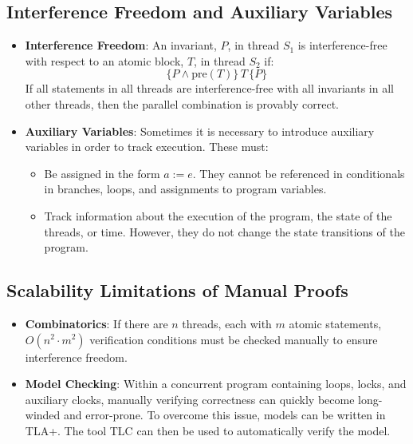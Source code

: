 \documentclass[a4paper,12pt]{report}
\begin{document}
\subsection{Interference Freedom and Auxiliary Variables}
\begin{itemize}[itemsep=0.25em, topsep=0.15em]
    \item \textbf{Interference Freedom}: An invariant, $P$, in thread $S_1$ is interference-free with respect to an atomic block, $T$, in thread $S_2$ if:
    \begin{equation}
        \{P \land \mathrm{pre}(T)\}\, T \,\{P\}
    \end{equation}
    If all statements in all threads are interference-free with all invariants in all other threads, then the parallel combination is provably correct.
    \item \textbf{Auxiliary Variables}: Sometimes it is necessary to introduce auxiliary variables in order to track execution. These must:
    \begin{itemize}[itemsep=0.15em]
        \item Be assigned in the form $a := e$. They cannot be referenced in conditionals in branches, loops, and assignments to program variables.
        \item Track information about the execution of the program, the state of the threads, or time. However, they do not change the state transitions of the program.
    \end{itemize}
\end{itemize}

\subsection{Scalability Limitations of Manual Proofs}
\begin{itemize}[itemsep=0.25em, topsep=0.15em]
    \item \textbf{Combinatorics}: If there are $n$ threads, each with $m$ atomic statements, $O(n^2 \cdot m^2)$ verification conditions must be checked manually to ensure interference freedom.
    \item \textbf{Model Checking}: Within a concurrent program containing loops, locks, and auxiliary clocks, manually verifying correctness can quickly become long-winded and error-prone. To overcome this issue, models can be written in TLA+. The tool TLC can then be used to automatically verify the model.
\end{itemize}
\end{document}
